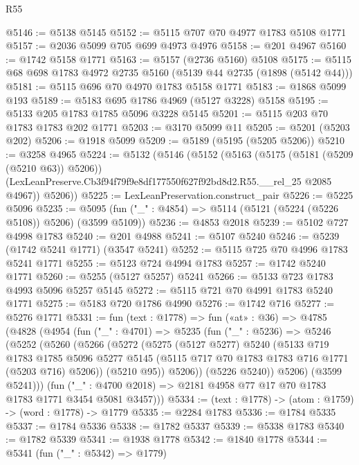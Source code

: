 \begin{lexlean}{R55}
\begin{coremodule}
@5146 := @5138 @5145
@5152 := @5115 @707 @70 @4977 @1783 @5108 @1771
@5157 := @2036 @5099 @705 @699 @4973 @4976
@5158 := @201 @4967
@5160 := @1742 @5158 @1771
@5163 := @5157 (@2736 @5160) @5108
@5175 := @5115 @68 @698 @1783 @4972 @2735 @5160 (@5139 @44 @2735 (@1898 (@5142 @44)))
@5181 := @5115 @696 @70 @4970 @1783 @5158 @1771
@5183 := @1868 @5099 @193
@5189 := @5183 @695 @1786 @4969 (@5127 @3228) @5158
@5195 := @5133 @205 @1783 @1785 @5096 @3228 @5145
@5201 := @5115 @203 @70 @1783 @1783 @202 @1771
@5203 := @3170 @5099 @11
@5205 := @5201 (@5203 @202)
@5206 := @1918 @5099
@5209 := @5189 (@5195 (@5205 @5206))
@5210 := @3258 @4965
@5224 := @5132
    (@5146
      (@5152
        (@5163
          (@5175 (@5181 (@5209 (@5210 @63)) @5206))
          (LexLeanPreserve.Cb3f94f79f9e8df177550f627f92bd8d2.R55.__rel_25 @2085 @4967))
        @5206))
@5225 := LexLeanPreservation.construct_pair
@5226 := @5225 @5096
@5235 := @5095 (fun ("_" : @4854) => @5114 (@5121 (@5224 (@5226 @5108)) @5206) (@3599 @5109))
@5236 := @4853 @2018
@5239 := @5102 @727 @4998 @1783
@5240 := @201 @4988
@5241 := @5107 @5240
@5246 := @5239 (@1742 @5241 @1771) (@3547 @5241)
@5252 := @5115 @725 @70 @4996 @1783 @5241 @1771
@5255 := @5123 @724 @4994 @1783
@5257 := @1742 @5240 @1771
@5260 := @5255 (@5127 @5257) @5241
@5266 := @5133 @723 @1783 @4993 @5096 @5257 @5145
@5272 := @5115 @721 @70 @4991 @1783 @5240 @1771
@5275 := @5183 @720 @1786 @4990
@5276 := @1742 @716
@5277 := @5276 @1771
@5331 := fun (text : @1778) =>
  fun («at» : @36) =>
  @4785
    (@4828
      (@4954
        (fun ("_" : @4701) =>
        @5235
          (fun ("_" : @5236) =>
          @5246
            (@5252
              (@5260
                (@5266
                  (@5272
                    (@5275
                      (@5127 @5277)
                      @5240
                      (@5133
                        @719
                        @1783
                        @1785
                        @5096
                        @5277
                        @5145
                        (@5115 @717 @70 @1783 @1783 @716 @1771 (@5203 @716) @5206))
                      (@5210 @95))
                    @5206))
                (@5226 @5240))
              @5206)
            (@3599 @5241)))
        (fun ("_" : @4700 @2018) => @2181 @4958 @77 @17 @70 @1783 @1783 @1771 @3454 @5081 @3457)))
@5334 := (text : @1778) -> (atom : @1759) -> (word : @1778) -> @1779
@5335 := @2284 @1783
@5336 := @1784 @5335
@5337 := @1784 @5336
@5338 := @1782 @5337
@5339 := @5338 @1783
@5340 := @1782 @5339
@5341 := @1938 @1778
@5342 := @1840 @1778
@5344 := @5341 (fun ("_" : @5342) => @1779)

\end{coremodule}
\end{lexlean}

